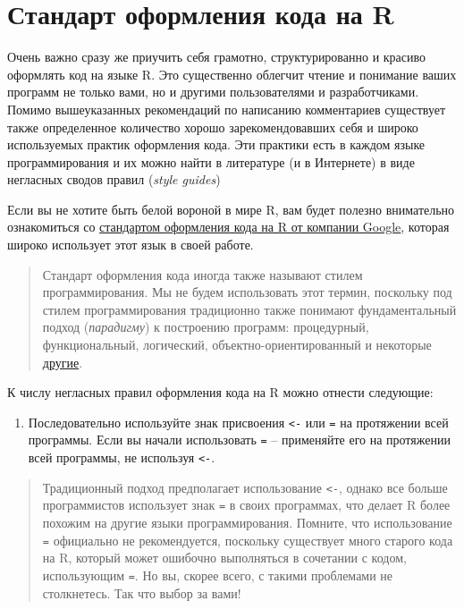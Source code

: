 \documentclass[]{book}
\providecommand{\tightlist}{%
  \setlength{\itemsep}{0pt}\setlength{\parskip}{0pt}}
\begin{document}
\section*{Стандарт оформления кода на R}\label{----r}

Очень важно сразу же приучить себя грамотно, структурированно и красиво
оформлять код на языке R. Это существенно облегчит чтение и понимание
ваших программ не только вами, но и другими пользователями и
разработчиками. Помимо вышеуказанных рекомендаций по написанию
комментариев существует также определенное количество хорошо
зарекомендовавших себя и широко используемых практик оформления кода.
Эти практики есть в каждом языке программирования и их можно найти в
литературе (и в Интернете) в виде негласных сводов правил (\emph{style
guides})

Если вы не хотите быть белой вороной в мире R, вам будет полезно
внимательно ознакомиться со
\href{https://google.github.io/styleguide/Rguide.xml\#filenames}{стандартом
оформления кода на R от компании Google}, которая широко использует этот
язык в своей работе.

\begin{quote}
Стандарт оформления кода иногда также называют стилем программирования.
Мы не будем использовать этот термин, поскольку под стилем
программирования традиционно также понимают фундаментальный подход
(\emph{парадигму}) к построению программ: процедурный, функциональный,
логический, объектно-ориентированный и некоторые
\href{https://ru.wikipedia.org/wiki/Парадигма_программирования}{другие}.
\end{quote}

К числу негласных правил оформления кода на R можно отнести следующие:

\begin{enumerate}
\def\labelenumi{\arabic{enumi}.}
\tightlist
\item
  Последовательно используйте знак присвоения \texttt{\textless{}-} или
  \texttt{=} на протяжении всей программы. Если вы начали использовать
  \texttt{=} -- применяйте его на протяжении всей программы, не
  используя \texttt{\textless{}-}.
\end{enumerate}

\begin{quote}
Традиционный подход предполагает использование \texttt{\textless{}-},
однако все больше программистов использует знак \texttt{=} в своих
программах, что делает R более похожим на другие языки программирования.
Помните, что использование \texttt{=} официально не рекомендуется,
поскольку существует много старого кода на R, который может ошибочно
выполняться в сочетании с кодом, использующим \texttt{=}. Но вы, скорее
всего, с такими проблемами не столкнетесь. Так что выбор за вами!
\end{quote}
\end{document}
